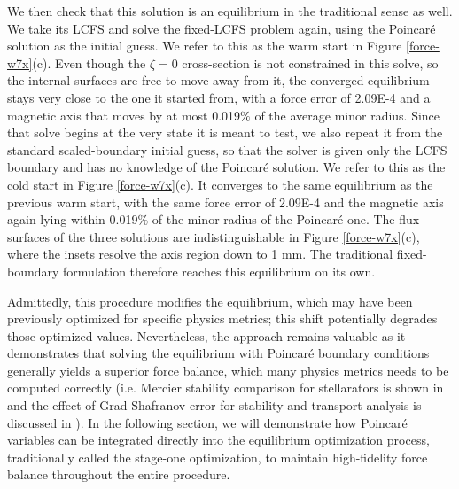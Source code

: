 \documentclass{jpp}
\begin{document}
We then check that this solution is an equilibrium in the traditional sense as well. We take its LCFS and solve the fixed-LCFS problem again, using the Poincaré solution as the initial guess. We refer to this as the warm start in Figure \ref{force-w7x}(c). Even though the $\zeta=0$ cross-section is not constrained in this solve, so the internal surfaces are free to move away from it, the converged equilibrium stays very close to the one it started from, with a force error of 2.09E-4 and a magnetic axis that moves by at most 0.019$\%$ of the average minor radius. Since that solve begins at the very state it is meant to test, we also repeat it from the standard scaled-boundary initial guess, so that the solver is given only the LCFS boundary and has no knowledge of the Poincaré solution. We refer to this as the cold start in Figure \ref{force-w7x}(c). It converges to the same equilibrium as the previous warm start, with the same force error of 2.09E-4 and the magnetic axis again lying within 0.019$\%$ of the minor radius of the Poincaré one. The flux surfaces of the three solutions are indistinguishable in Figure \ref{force-w7x}(c), where the insets resolve the axis region down to 1 mm. The traditional fixed-boundary formulation therefore reaches this equilibrium on its own.

Admittedly, this procedure modifies the equilibrium, which may have been previously optimized for specific physics metrics; this shift potentially degrades those optimized values. Nevertheless, the approach remains valuable as it demonstrates that solving the equilibrium with Poincaré boundary conditions generally yields a superior force balance, which many physics metrics needs to be computed correctly (i.e. Mercier stability comparison for stellarators is shown in \citep{paniciDESCStellaratorCode2023} and the effect of Grad-Shafranov error for stability and transport analysis is discussed in \citep{xing_cake_2021, jiang_kinetic_2021}). In the following section, we will demonstrate how Poincaré variables can be integrated directly into the equilibrium optimization process, traditionally called the stage-one optimization, to maintain high-fidelity force balance throughout the entire procedure.
\end{document}
